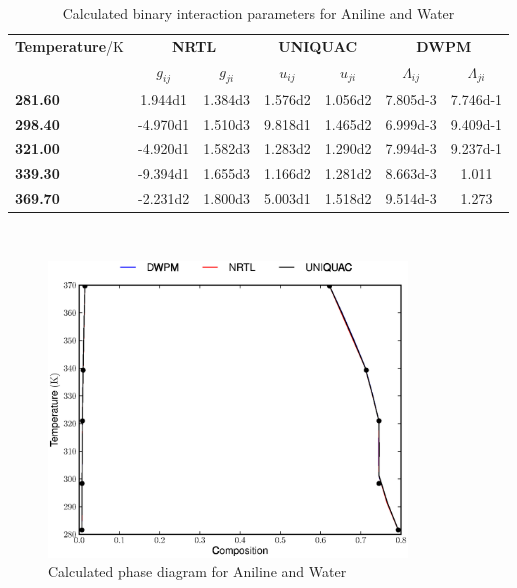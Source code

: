 \begin{landscape}
\vspace*{\fill}
\begin{table}[h]
\caption{Calculated binary interaction parameters for Aniline and Water} 
\centering
\begin{tabular}{lcccccc}
\toprule
\textbf{Temperature}/$\mathrm{K}$&\multicolumn{2}{c}{\textbf{NRTL}}&\multicolumn{2}{c}{\textbf{UNIQUAC}}&\multicolumn{2}{c}{\textbf{DWPM}}\\
\cmidrule(r){2-7}
&$g_{ij}$&$g_{ji}$&$u_{ij}$&$u_{ji}$&$\Lambda_{ij}$&$\Lambda_{ji}$\\
\midrule
\textbf{ 281.60 } & \num{1.944d1} & \num{1.384d3} & \num{1.576d2} & \num{1.056d2} & \num{7.805d-3} & \num{7.746d-1}\\
\textbf{ 298.40 } & \num{-4.970d1} & \num{1.510d3} & \num{9.818d1} & \num{1.465d2} & \num{6.999d-3} & \num{9.409d-1}\\
\textbf{ 321.00 } & \num{-4.920d1} & \num{1.582d3} & \num{1.283d2} & \num{1.290d2} & \num{7.994d-3} & \num{9.237d-1}\\
\textbf{ 339.30 } & \num{-9.394d1} & \num{1.655d3} & \num{1.166d2} & \num{1.281d2} & \num{8.663d-3} & \num{1.011}\\
\textbf{ 369.70 } & \num{-2.231d2} & \num{1.800d3} & \num{5.003d1} & \num{1.518d2} & \num{9.514d-3} & \num{1.273}\\
\bottomrule
\end{tabular}\\
\label{AnilineWaterTable}
\end{table}
\vspace*{\fill}
\end{landscape}


\begin{figure}[hp]
\centering
\includegraphics[width = 0.85\textwidth]{Results_Parts/BinaryParams/aniline-water/PhaseDiagram.eps}
\caption{Calculated phase diagram for Aniline and Water} \label{aniline-waterFigure}
\end{figure}\

